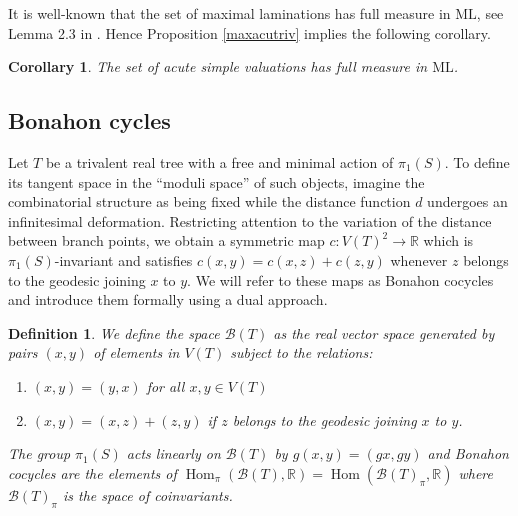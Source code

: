 \documentclass{amsart}
\newtheorem{definition}{Definition}
\newtheorem{corollary}{Corollary}
\newcommand{\R}{\mathbb{R}}
\newcommand{\ML}{\mathrm{ML}}
\newcommand{\Bb}{\mathcal{B}}
\DeclareMathOperator{\Hom}{Hom}
\begin{document}
It is well-known that the set of maximal laminations has full measure in $\ML$, see Lemma 2.3 in \cite{Lindenstrauss-Mirzakhani}. Hence Proposition \ref{maxacutriv} implies the following corollary.

\begin{corollary}
The set of acute simple valuations has full measure in $\ML$.
\end{corollary}

\subsection{Bonahon cycles}

Let $T$ be a trivalent real tree with a free and minimal action of $\pi_1(S)$. To define its tangent space in the ``moduli space'' of such objects, imagine the combinatorial structure as being fixed while the distance function $d$ undergoes an infinitesimal deformation. Restricting attention to the variation of the distance between branch points, we obtain a symmetric map $c:V(T)^2\to \R$ which is $\pi_1(S)$-invariant and satisfies $c(x,y)=c(x,z)+c(z,y)$ whenever $z$ belongs to the geodesic joining $x$ to $y$. We will refer to these maps as Bonahon cocycles and introduce them formally using a dual approach.

\begin{definition}
We define the space $\Bb(T)$ as the real vector space generated by pairs $(x,y)$ of elements in $V(T)$ subject to the relations:
\begin{enumerate}
    \item $(x,y)=(y,x)$ for all $x,y\in V(T)$
    \item $(x,y)=(x,z)+(z,y)$ if $z$ belongs to the geodesic joining $x$ to $y$. 
\end{enumerate}
The group $\pi_1(S)$ acts linearly on $\Bb(T)$ by $g(x,y)=(gx,gy)$ and Bonahon cocycles are the elements of $\Hom_\pi(\Bb(T),\R)=\Hom(\Bb(T)_\pi,\R)$ where $\Bb(T)_\pi$ is the space of coinvariants.
\end{definition}
\end{document}
